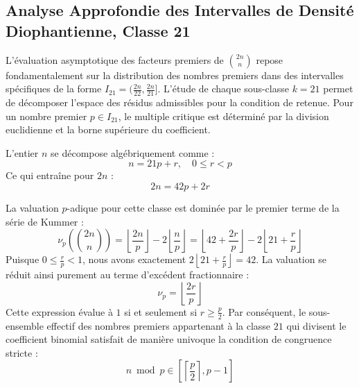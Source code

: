 \documentclass[12pt,a4paper]{article}
\begin{document}
    \newpage
    \subsection{Analyse Approfondie des Intervalles de Densité Diophantienne, Classe 21}
    L'évaluation asymptotique des facteurs premiers de $\binom{2n}{n}$ repose fondamentalement sur la distribution des nombres premiers dans des intervalles spécifiques de la forme $I_21 = (\frac{2n}{22}, \frac{2n}{21}]$.
    L'étude de chaque sous-classe $k = 21$ permet de décomposer l'espace des résidus admissibles pour la condition de retenue.
    Pour un nombre premier $p \in I_21$, le multiple critique est déterminé par la division euclidienne et la borne supérieure du coefficient.

    L'entier $n$ se décompose algébriquement comme :
    \begin{equation}
    n = 21 p + r, \quad 0 \le r < p
    \end{equation}
    Ce qui entraîne pour $2n$ :
    \begin{equation}
    2n = 42 p + 2r
    \end{equation}

    La valuation $p$-adique pour cette classe est dominée par le premier terme de la série de Kummer :
    \begin{equation}
    \nu_p\left( \binom{2n}{n} \right) = \left\lfloor \frac{2n}{p} \right\rfloor - 2 \left\lfloor \frac{n}{p} \right\rfloor = \left\lfloor 42 + \frac{2r}{p} \right\rfloor - 2 \left\lfloor 21 + \frac{r}{p} \right\rfloor
    \end{equation}
    Puisque $0 \le \frac{r}{p} < 1$, nous avons exactement $2 \left\lfloor 21 + \frac{r}{p} \right\rfloor = 42$.
    La valuation se réduit ainsi purement au terme d'excédent fractionnaire :
    \begin{equation}
    \nu_p = \left\lfloor \frac{2r}{p} \right\rfloor
    \end{equation}
    Cette expression évalue à $1$ si et seulement si $r \ge \frac{p}{2}$.
    Par conséquent, le sous-ensemble effectif des nombres premiers appartenant à la classe $21$ qui divisent le coefficient binomial satisfait de manière univoque la condition de congruence stricte :
    \begin{equation}
    n \bmod p \in \left[ \left\lceil \frac{p}{2} \right\rceil, p - 1 \right]
    \end{equation}
\end{document}
